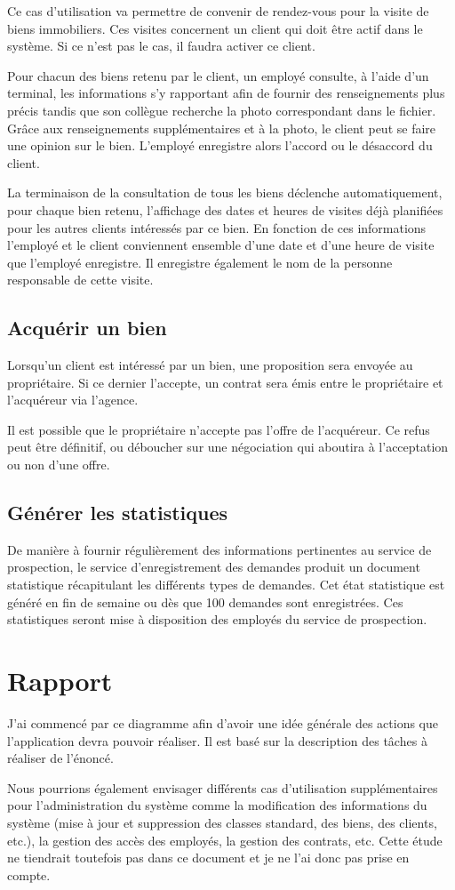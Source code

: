 Ce cas d'utilisation va permettre de convenir de rendez-vous pour la visite de biens immobiliers. Ces visites concernent un client qui doit être actif dans le système. Si ce n'est pas le cas, il faudra activer ce client.

Pour chacun des biens retenu par le client, un employé consulte, à l'aide d'un terminal, les informations s'y rapportant afin de fournir des renseignements plus précis tandis que son collègue recherche la photo correspondant dans le fichier. Grâce aux renseignements supplémentaires et à la photo, le client peut se faire une opinion sur le bien. L'employé enregistre alors l'accord ou le désaccord du client.

La terminaison de la consultation de tous les biens déclenche automatiquement, pour chaque bien retenu, l'affichage des dates et heures de visites déjà planifiées pour les autres clients intéressés par ce bien. En fonction de ces informations l'employé et le client conviennent ensemble d'une date et d'une heure de visite que l'employé enregistre. Il enregistre également le nom de la personne responsable de cette visite.

\subsection{Acquérir un bien}

Lorsqu'un client est intéressé par un bien, une proposition sera envoyée au propriétaire. Si ce dernier l'accepte, un contrat sera émis entre le propriétaire et l'acquéreur via l'agence.

Il est possible que le propriétaire n'accepte pas l'offre de l'acquéreur. Ce refus peut être définitif, ou déboucher sur une négociation qui aboutira à l'acceptation ou non d'une offre.

\subsection{Générer les statistiques}

De manière à fournir régulièrement des informations pertinentes au service de prospection, le service d'enregistrement des demandes produit un document statistique récapitulant les différents types de demandes. Cet état statistique est généré en fin de semaine ou dès que 100 demandes sont enregistrées. Ces statistiques seront mise à disposition des employés du service de prospection.

\section{Rapport}

J'ai commencé par ce diagramme afin d'avoir une idée générale des actions que l'application devra pouvoir réaliser. Il est basé sur la description des tâches à réaliser de l'énoncé.

Nous pourrions également envisager différents cas d'utilisation supplémentaires pour l'administration du système comme la modification des informations du système (mise à jour et suppression des classes standard, des biens, des clients, etc.), la gestion des accès des employés, la gestion des contrats, etc. Cette étude ne tiendrait toutefois pas dans ce document et je ne l'ai donc pas prise en compte.